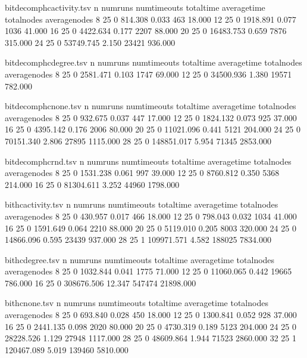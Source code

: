 \begin{filecontents}{bitdecomphcactivity.tsv}
	n	numruns	numtimeouts	totaltime	averagetime	totalnodes	averagenodes
	8	25	0	814.308	0.033	463	18.000
	12	25	0	1918.891	0.077	1036	41.000
	16	25	0	4422.634	0.177	2207	88.000
	20	25	0	16483.753	0.659	7876	315.000
	24	25	0	53749.745	2.150	23421	936.000
\end{filecontents}

\begin{filecontents}{bitdecomphcdegree.tsv}
	n	numruns	numtimeouts	totaltime	averagetime	totalnodes	averagenodes
	8	25	0	2581.471	0.103	1747	69.000
	12	25	0	34500.936	1.380	19571	782.000
\end{filecontents}

\begin{filecontents}{bitdecomphcnone.tsv}
	n	numruns	numtimeouts	totaltime	averagetime	totalnodes	averagenodes
	8	25	0	932.675	0.037	447	17.000
	12	25	0	1824.132	0.073	925	37.000
	16	25	0	4395.142	0.176	2006	80.000
	20	25	0	11021.096	0.441	5121	204.000
	24	25	0	70151.340	2.806	27895	1115.000
	28	25	0	148851.017	5.954	71345	2853.000
\end{filecontents}

\begin{filecontents}{bitdecomphcrnd.tsv}
	n	numruns	numtimeouts	totaltime	averagetime	totalnodes	averagenodes
	8	25	0	1531.238	0.061	997	39.000
	12	25	0	8760.812	0.350	5368	214.000
	16	25	0	81304.611	3.252	44960	1798.000
\end{filecontents}

\begin{filecontents}{bithcactivity.tsv}
	n	numruns	numtimeouts	totaltime	averagetime	totalnodes	averagenodes
	8	25	0	430.957	0.017	466	18.000
	12	25	0	798.043	0.032	1034	41.000
	16	25	0	1591.649	0.064	2210	88.000
	20	25	0	5119.010	0.205	8003	320.000
	24	25	0	14866.096	0.595	23439	937.000
	28	25	1	109971.571	4.582	188025	7834.000
\end{filecontents}

\begin{filecontents}{bithcdegree.tsv}
	n	numruns	numtimeouts	totaltime	averagetime	totalnodes	averagenodes
	8	25	0	1032.844	0.041	1775	71.000
	12	25	0	11060.065	0.442	19665	786.000
	16	25	0	308676.506	12.347	547474	21898.000
\end{filecontents}

\begin{filecontents}{bithcnone.tsv}
	n	numruns	numtimeouts	totaltime	averagetime	totalnodes	averagenodes
	8	25	0	693.840	0.028	450	18.000
	12	25	0	1300.841	0.052	928	37.000
	16	25	0	2441.135	0.098	2020	80.000
	20	25	0	4730.319	0.189	5123	204.000
	24	25	0	28228.526	1.129	27948	1117.000
	28	25	0	48609.864	1.944	71523	2860.000
	32	25	1	120467.089	5.019	139460	5810.000
\end{filecontents}


